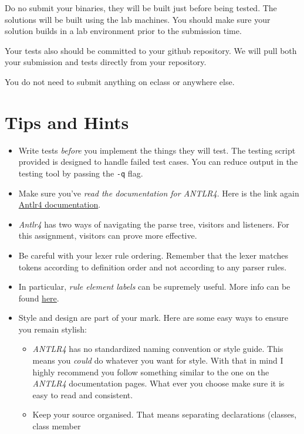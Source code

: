 \documentclass{article}
\newcommand{\code}[1]{\texttt{\textmd{#1}}}
\begin{document}
Do no submit your binaries, they will be built just before being tested. The solutions will be
built using the lab machines. You should make sure your solution builds in a lab environment prior
to the submission time.

Your tests also should be committed to your github repository. We will pull both your submission
and tests directly from your repository.

You do not need to submit anything on eclass or anywhere else.

\section{Tips and Hints}
\begin{itemize}
  \item
    Write tests \textit{before} you implement the things they will test. The testing script
    provided is designed to handle failed test cases. You can reduce output in the testing tool by
    passing the \code{-q} flag.
  \item
    Make sure you've \textit{read the documentation for ANTLR4}. Here is the link again
    \href{https://github.com/antlr/antlr4/blob/master/doc/index.md} {Antlr4 documentation}.
  \item
    \textit{Antlr4} has two ways of navigating the parse tree, visitors and listeners. For this
    assignment, visitors can prove more effective.
  \item
    Be careful with your lexer rule ordering. Remember that the lexer matches tokens according to
    definition order and not according to any parser rules.
  \item
    In particular, \textit{rule element labels} can be supremely useful. More info can be found
    \href{https://github.com/antlr/antlr4/blob/master/doc/parser-rules.md\#alternative-labels}
    {here}.
  \item
    Style and design are part of your mark. Here are some easy ways to ensure you remain stylish:
    \begin{itemize}
    \item
      \textit{ANTLR4} has no standardized naming convention or style guide. This means you
      \textit{could} do whatever you want for style. With that in mind I highly recommend you
      follow something similar to the one on the \textit{ANTLR4} documentation pages. What ever you
      choose make sure it is easy to read and consistent.
    \item
      Keep your source organised. That means separating declarations (classes, class member

\end{itemize}
\end{itemize}
\end{document}
